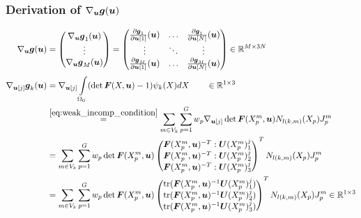 \subsubsection{Derivation of $\nabla_{\boldsymbol{u}}\boldsymbol{g}(\boldsymbol{u})$}
\begin{align*}
	\nabla_{\vu}\vg(\vu) &= \m{\nabla_{\vu}\vg_1(\vu)\\ \vdots \\ \nabla_{\vu}\vg_M(\vu)}
	 = \m{\d{\vg_1}{\vu[1]}(\vu) & \ldots & \d{\vg_1}{\vu[N]}(\vu)\\
	 	\vdots & \ddots & \vdots\\
	   \d{\vg_M}{\vu[1]}(\vu) & \ldots & \d{\vg_M}{\vu[N]}(\vu)} \in\R^{M \times 3N}\\
	\nabla_{\vu[j]}\vg_k(\vu) &= \nabla_{\vu[j]}\intor (\det\vF(X,\vu)-1)\psi_k(X)dX\qquad\in\R^{1\times 3}\\
		&\re{eq:weak_incomp_condition}  \sumvk\sumgp w_p \nabla_{\vu[j]}\det\vF(\pmp,\vu)\Nkmp\jmp\\
		&= \sumvk\sumgp w_p \det\vF(\pmp,\vu)\m{\vF(\pmp,\vu)^{-T}:\vU(\pmp)^j_1\\\vF(\pmp,\vu)^{-T}:\vU(\pmp)^j_2\\\vF(\pmp,\vu)^{-T}:\vU(\pmp)^j_3}^TN_{l(k,m)}(X_p)\jmp\\
		&= \sumvk\sumgp w_p \det\vF(\pmp,\vu)\m{\tr(\vF(\pmp,\vu)^{-1}\vU(\pmp)^j_1)\\\tr(\vF(\pmp,\vu)^{-1}\vU(\pmp)^j_2)\\\tr(\vF(\pmp,\vu)^{-1}\vU(\pmp)^j_3)}^TN_{l(k,m)}(X_p)\jmp\in\R^{1\times 3}
\end{align*}



